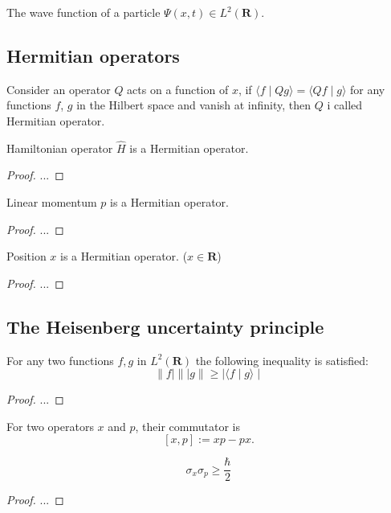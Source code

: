 \begin{remark}
    The wave function of a particle $\Psi(x,t) \in L^2(\mathbf{R})$.
\end{remark}

\subsection{Hermitian operators}

\begin{definition}
    Consider an operator $Q$ acts on a function of $x$, if $\langle f \mid Q g\rangle = \langle Q f \mid g\rangle$ for any functions $f$, $g$ in the Hilbert space and vanish at infinity, then $Q$ i called Hermitian operator.
\end{definition}

\begin{remark}
    Hamiltonian operator $\hat{H}$ is a Hermitian operator.
\end{remark}

\begin{proof}
    ...
\end{proof}

\begin{remark}
    Linear momentum $p$ is a Hermitian operator.
\end{remark}

\begin{proof}
    ...
\end{proof}

\begin{remark}
    Position $x$ is a Hermitian operator. ($x \in \mathbf{R}$)
\end{remark}

\begin{proof}
    ...
\end{proof}

\subsection{The Heisenberg uncertainty principle}

\begin{theorem}
    For any two functions $f, g$ in $L^{2}(\mathbf{R})$ the following inequality is satisfied:
$$
\|f|\||g \| \geq|\langle f \mid g\rangle \mid
$$
\end{theorem}

\begin{proof}
    ...
\end{proof}

\begin{definition}[Commutator]
    For two operators $x$ and $p$, their commutator is 
    $$
    [x, p]:=x p-p x .
    $$ 
\end{definition}

\begin{theorem}
    $$
    \sigma_{x} \sigma_{p} \geq \frac{\hbar}{2}
    $$
\end{theorem}

\begin{proof}
    ...
\end{proof}